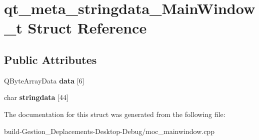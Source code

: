 \section{qt\-\_\-meta\-\_\-stringdata\-\_\-\-Main\-Window\-\_\-t Struct Reference}
\label{structqt__meta__stringdata___main_window__t}
\subsection*{Public Attributes}
\begin{DoxyCompactItemize}
\item 
Q\-Byte\-Array\-Data {\bfseries data} [6]\label{structqt__meta__stringdata___main_window__t_af598c0b01c666753185a38017d12d5cc}

\item 
char {\bfseries stringdata} [44]\label{structqt__meta__stringdata___main_window__t_aa503b5aa1215c5044c71808a38a8c946}

\end{DoxyCompactItemize}


The documentation for this struct was generated from the following file\-:\begin{DoxyCompactItemize}
\item 
build-\/\-Gestion\-\_\-\-Deplacements-\/\-Desktop-\/\-Debug/moc\-\_\-mainwindow.\-cpp\end{DoxyCompactItemize}

